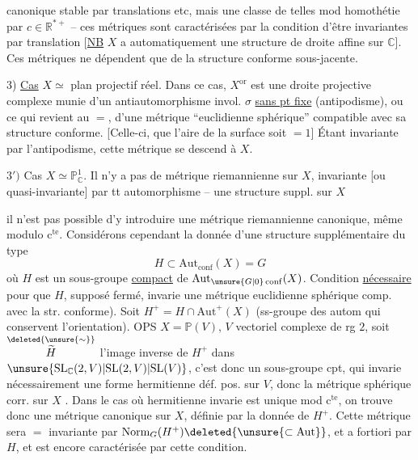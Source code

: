 
canonique stable par translations etc, mais une classe de telles mod homothétie par $c\in\mathbb R^{*+}$ -- ces métriques sont caractérisées par la condition d'être invariantes par translation [\uline{NB} $X$ a automatiquement une structure de droite affine sur $\mathbb C$]. Ces métriques  ne dépendent que de la structure conforme sous-jacente.

3) \uline{Cas}  $X\simeq$ plan projectif réel. Dans ce   cas, $X^{\mathrm{or}}$ est une droite projective complexe munie d'un antiautomorphisme invol. $\sigma$ \uline{sans pt fixe} (antipodisme), ou ce qui revient au $=$, d'une métrique ``euclidienne sphérique'' compatible avec sa structure conforme. [Celle-ci,     que l'aire de la surface soit $=1$] Étant invariante par l'antipodisme, cette métrique se descend à $X$.

$3')$ Cas $X\simeq\mathbb P^1_{\mathbb C}$. Il n'y a pas de métrique riemannienne sur $X$, invariante [ou quasi-invariante] par tt automorphisme --  une structure suppl. sur $X$



il n'est pas possible d'y introduire une métrique riemannienne canonique, même modulo $\mathrm c^{\mathrm{te}}$. Considérons cependant la donnée d'une structure supplémentaire du type
\[
H\subset\mathrm{Aut}_{\mathrm{conf}}(X)=G
\]
où $H$ est un sous-groupe \uline{compact} de $\mathrm{Aut}_{\unsure{G|0}\,\mathrm{conf}}(X)$. Condition \uline{nécessaire} pour que $H$, supposé fermé, invarie une métrique euclidienne sphérique comp. avec la str. conforme). Soit $H^+=H\cap\mathrm{Aut}^+(X)$ (ss-groupe des autom qui conservent l'orientation). OPS $X=\mathbb P(V)$, $V$ vectoriel complexe de rg $2$,  soit $\overset{\deleted{\unsure{\sim}}}{\widetilde H}$ l'image inverse de $H^+$ dans $\unsure{\mathrm{SL}_{\mathbb C}(2,V)|\mathrm{SL}(2,V)|\mathrm{SL}(V)}$, c'est donc un sous-groupe cpt, qui invarie nécessairement une forme hermitienne déf. pos. sur $V$, donc la métrique sphérique corr. sur $X$ . Dans le cas où   hermitienne invarie est unique mod $\mathrm c^{\mathrm{te}}$, on trouve donc une métrique  canonique sur $X$, définie par la  donnée de $H^+$. Cette métrique sera $=$ invariante par $\mathrm{Norm}_G(H^+)\deleted{\unsure{\subset\mathrm{Aut}}}$, et a fortiori par $H$, et est encore caractérisée par cette condition.

